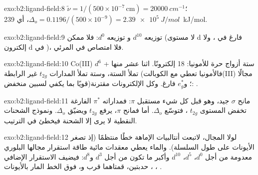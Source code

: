 \begin{solution}{exo:b2:ligand-field:8}
$\tilde\nu = 1/(500 \times 10^{-7}\,\text{cm}) = \qty{20000}{cm^{-1}}$؛ $\Delta_o =
0.1196/(500 \times 10^{-9}) = \qty{2.39e5}{J/mol}$، أي \qty{239}{kJ/mol}.
\end{solution}

\begin{solution}{exo:b2:ligand-field:9}
 توزيعه $d^{10}$ و توزيعه $d^0$: فلا  ممكن (لا مستوى d فارغ
في ، ولا إلكترون d في )، فلا امتصاص في المرئي.
\end{solution}

\begin{solution}{exo:b2:ligand-field:10}
Co(III) $d^6$ + ستة أزواج حرة للأمونيا: 18 إلكترونًا. اثنا عشر منها تملأ  الستة،
وستة تملأ المدارات $t_{2g}$ غير الرابطة (فالأمونيا تعطي مع الكوبالت(III) مجالًا قويًا بما يكفي
لسبين منخفض)؛ و$e_g^*$ فارغ. وكل الإلكترونات مقترنة: .
\end{solution}

\begin{solution}{exo:b2:ligand-field:11}
 مانح $\sigma$ جيد، وهو قبل كل شيء مستقبل $\pi$: فمداراته $\pi^*$ الفارغة
تخفض المستوى $t_{2g}$ ، فتوسّع $\Delta_o$. أما  فمانح $\pi$، يرفع
$t_{2g}$ ويضيّق $\Delta_o$. ونموذج الشحنات النقطية لا يرى إلا الشحنة فيخطئ في
الترتيب.
\end{solution}

\begin{solution}{exo:b2:ligand-field:12}
لولا المجال، لاتبعت أنتالبيات الإماهة خطًا منتظمًا (إذ تصغر الأيونات على طول
السلسلة). والماء يعطي معقدات مائية  طاقة استقرار مجالها البلوري معدومة من أجل $d^0$، $d^5$، $d^{10}$
وأكبر ما تكون من أجل $d^3$ و$d^8$: فيضيف الاستقرار الإضافي حدبتين، قمتاهما قرب
 و، فوق الخط المار بالأيونات ، ، .
\end{solution}

